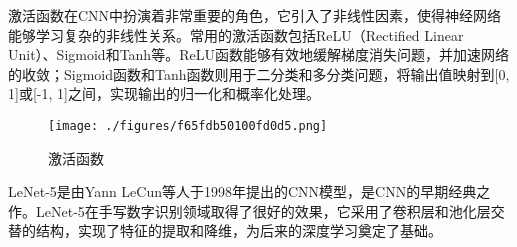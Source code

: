 激活函数在CNN中扮演着非常重要的角色，它引入了非线性因素，使得神经网络能够学习复杂的非线性关系。常用的激活函数包括ReLU（Rectified Linear Unit）、Sigmoid和Tanh等。ReLU函数能够有效地缓解梯度消失问题，并加速网络的收敛；Sigmoid函数和Tanh函数则用于二分类和多分类问题，将输出值映射到[0, 1]或[-1, 1]之间，实现输出的归一化和概率化处理。
\begin{figure}[ht]
\centering
\texttt{[image: ./figures/f65fdb50100fd0d5.png]}
\caption{激活函数} \label{fig_CNN3_3}
\end{figure}

LeNet-5是由Yann LeCun等人于1998年提出的CNN模型，是CNN的早期经典之作。LeNet-5在手写数字识别领域取得了很好的效果，它采用了卷积层和池化层交替的结构，实现了特征的提取和降维，为后来的深度学习奠定了基础。